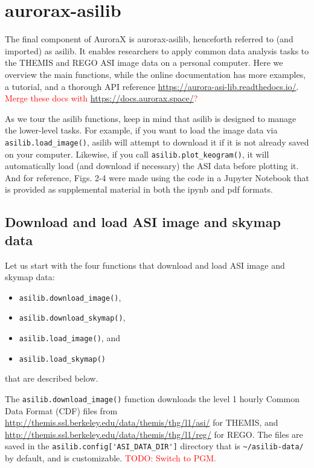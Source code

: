 \documentclass[draft]{agujournal2019}
\begin{document}
\section{aurorax-asilib}\label{aurorax-asilib}
The final component of AuroraX is aurorax-asilib, henceforth referred to (and imported) as asilib. It enables researchers to apply common data analysis tasks to the THEMIS and REGO ASI image data on a personal computer. Here we overview the main functions, while the online documentation has more examples, a tutorial, and a thorough API reference \url{https://aurora-asi-lib.readthedocs.io/}. \textcolor{red}{Merge these docs with \url{https://docs.aurorax.space/}?}

As we tour the asilib functions, keep in mind that asilib is designed to manage the lower-level tasks. For example, if you want to load the image data via \verb|asilib.load_image()|, asilib will attempt to download it if it is not already saved on your computer. Likewise, if you call \verb|asilib.plot_keogram()|, it will automatically load (and download if necessary) the ASI data before plotting it. And for reference, Figs. 2-4 were made using the code in a Jupyter Notebook that is provided as supplemental material in both the ipynb and pdf formats.

\subsection{Download and load ASI image and skymap data}
Let us start with the four functions that download and load ASI image and skymap data: 

\begin{itemize}
      \item \verb|asilib.download_image()|,
      \item \verb|asilib.download_skymap()|,
      \item \verb|asilib.load_image()|, and
      \item \verb|asilib.load_skymap()|
\end{itemize} that are described below.

The \verb|asilib.download_image()| function downloads the level 1 hourly Common Data Format (CDF) files from \url{http://themis.ssl.berkeley.edu/data/themis/thg/l1/asi/} for THEMIS, and \url{http://themis.ssl.berkeley.edu/data/themis/thg/l1/reg/} for REGO. The files are saved in the \verb|asilib.config['ASI_DATA_DIR']| directory that is \verb|~/asilib-data/| by default, and is customizable. \textcolor{red}{TODO: Switch to PGM.}
\end{document}

